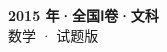\documentclass[zihao=-4, a4paper]{ctexart}
\begin{document}
\begin{center}
  {\Large\bfseries 2015 年·全国Ⅰ卷·文科}\\[4pt]
  {\large 数学 · 试题版}
\end{center}
\medskip
{}

\end{document}
